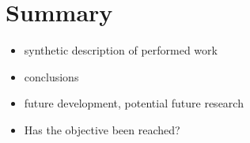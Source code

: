 \documentclass[a4paper,twoside,12pt]{book}
\newcounter{PagesWithoutNumbers}
\begin{document}
\chapter{Summary}
\begin{itemize}
\item synthetic description of performed work
\item conclusions
\item  future development, potential future research
\item Has the objective been reached?
\end{itemize}


\backmatter
{}
\setcounter{page}{\value{PagesWithoutNumbers}}

\pagestyle{onlyPageNumbers}




\end{document}
